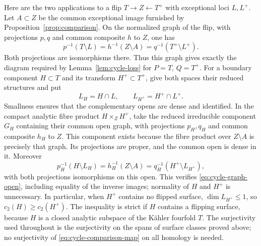 Here are the two applications to a flip
$T\to Z\leftarrow T^+$ with exceptional loci $L,L^+$.
Let $A\subset Z$ be the common exceptional image furnished by
Proposition~\ref{prop:comparison}.  On the normalized graph of the
flip, with projections $p,q$ and common composite $h$ to $Z$, one has
\[
 p^{-1}(T\setminus L)=h^{-1}(Z\setminus A)
                    =q^{-1}(T^+\setminus L^+).
\]
Both projections are isomorphisms there.  Thus this graph gives exactly
the diagram required by Lemma~\ref{lem:cycle-loss} for $P=T$, $Q=T^+$.
For a boundary component $H\subset T$ and its transform
$H^+\subset T^+$, give both spaces their reduced structures and put
\[
 L_H=H\cap L,\qquad L_{H^+}=H^+\cap L^+.
\]
Smallness ensures that the complementary opens are dense and
identified.  In the compact analytic fibre product $H\times_Z H^+$,
take the reduced irreducible component $G_H$ containing their common
open graph, with projections $p_H,q_H$ and common composite $h_H$ to
$Z$.  This component exists because the fibre product over
$Z\setminus A$ is precisely that graph.  Its projections are proper,
and the common open is dense in it.  Moreover
\[
 p_H^{-1}(H\setminus L_H)=h_H^{-1}(Z\setminus A)
                       =q_H^{-1}(H^+\setminus L_{H^+}),
\]
with both projections isomorphisms on this open.  This verifies
\eqref{eq:cycle-graph-open}, including equality of the inverse images;
normality of $H$ and $H^+$ is unnecessary.
In particular, when $H^+$ contains no flipped surface,
$\dim L_{H^+}\leq1$, so $c_2(H)\geq c_2(H^+)$.  The inequality is
strict if $H$ contains a flipping surface, because $H$ is a closed
analytic subspace of the K\"ahler fourfold $T$.  The surjectivity used
throughout is the surjectivity on the spans of surface classes proved
above; no surjectivity of \eqref{eq:cycle-comparison-map} on all homology
is needed.
